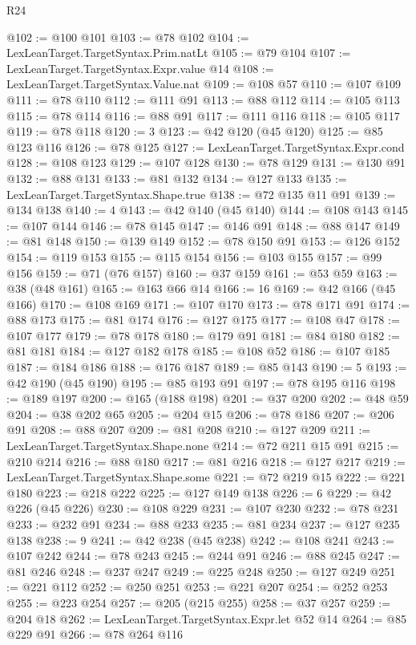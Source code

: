 \begin{lexlean}{R24}
\begin{coremodule}
@102 := @100 @101
@103 := @78 @102
@104 := LexLeanTarget.TargetSyntax.Prim.natLt
@105 := @79 @104
@107 := LexLeanTarget.TargetSyntax.Expr.value @14
@108 := LexLeanTarget.TargetSyntax.Value.nat
@109 := @108 @57
@110 := @107 @109
@111 := @78 @110
@112 := @111 @91
@113 := @88 @112
@114 := @105 @113
@115 := @78 @114
@116 := @88 @91
@117 := @111 @116
@118 := @105 @117
@119 := @78 @118
@120 := 3
@123 := @42 @120 (@45 @120)
@125 := @85 @123 @116
@126 := @78 @125
@127 := LexLeanTarget.TargetSyntax.Expr.cond
@128 := @108 @123
@129 := @107 @128
@130 := @78 @129
@131 := @130 @91
@132 := @88 @131
@133 := @81 @132
@134 := @127 @133
@135 := LexLeanTarget.TargetSyntax.Shape.true
@138 := @72 @135 @11 @91
@139 := @134 @138
@140 := 4
@143 := @42 @140 (@45 @140)
@144 := @108 @143
@145 := @107 @144
@146 := @78 @145
@147 := @146 @91
@148 := @88 @147
@149 := @81 @148
@150 := @139 @149
@152 := @78 @150 @91
@153 := @126 @152
@154 := @119 @153
@155 := @115 @154
@156 := @103 @155
@157 := @99 @156
@159 := @71 (@76 @157)
@160 := @37 @159
@161 := @53 @59
@163 := @38 (@48 @161)
@165 := @163 @66 @14
@166 := 16
@169 := @42 @166 (@45 @166)
@170 := @108 @169
@171 := @107 @170
@173 := @78 @171 @91
@174 := @88 @173
@175 := @81 @174
@176 := @127 @175
@177 := @108 @47
@178 := @107 @177
@179 := @78 @178
@180 := @179 @91
@181 := @84 @180
@182 := @81 @181
@184 := @127 @182 @178
@185 := @108 @52
@186 := @107 @185
@187 := @184 @186
@188 := @176 @187
@189 := @85 @143
@190 := 5
@193 := @42 @190 (@45 @190)
@195 := @85 @193 @91
@197 := @78 @195 @116
@198 := @189 @197
@200 := @165 (@188 @198)
@201 := @37 @200
@202 := @48 @59
@204 := @38 @202 @65
@205 := @204 @15
@206 := @78 @186
@207 := @206 @91
@208 := @88 @207
@209 := @81 @208
@210 := @127 @209
@211 := LexLeanTarget.TargetSyntax.Shape.none
@214 := @72 @211 @15 @91
@215 := @210 @214
@216 := @88 @180
@217 := @81 @216
@218 := @127 @217
@219 := LexLeanTarget.TargetSyntax.Shape.some
@221 := @72 @219 @15
@222 := @221 @180
@223 := @218 @222
@225 := @127 @149 @138
@226 := 6
@229 := @42 @226 (@45 @226)
@230 := @108 @229
@231 := @107 @230
@232 := @78 @231
@233 := @232 @91
@234 := @88 @233
@235 := @81 @234
@237 := @127 @235 @138
@238 := 9
@241 := @42 @238 (@45 @238)
@242 := @108 @241
@243 := @107 @242
@244 := @78 @243
@245 := @244 @91
@246 := @88 @245
@247 := @81 @246
@248 := @237 @247
@249 := @225 @248
@250 := @127 @249
@251 := @221 @112
@252 := @250 @251
@253 := @221 @207
@254 := @252 @253
@255 := @223 @254
@257 := @205 (@215 @255)
@258 := @37 @257
@259 := @204 @18
@262 := LexLeanTarget.TargetSyntax.Expr.let @52 @14
@264 := @85 @229 @91
@266 := @78 @264 @116

\end{coremodule}
\end{lexlean}
